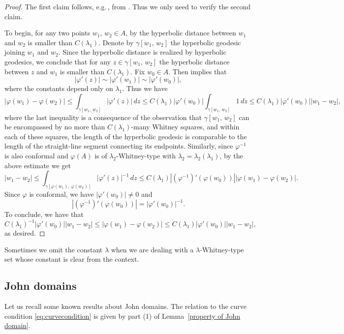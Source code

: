\documentclass[reqno,11pt]{amsart}
\numberwithin{equation}{section}
\theoremstyle{remark}
\begin{document}
\begin{proof}
The first claim follows, e.g.\,, from  \cite[Lemma 2.12]{KRZ2015}. Thus we only need to verify the second claim. 

To begin, for any two points $w_1,\,w_2\in A$, by \cite[Lemma 2.11]{KRZ2015} the hyperbolic distance between $w_1$ and $w_2$ is smaller than $C(\lambda_1)$. 
Denote by $\gamma[w_1,\,w_2]$ the  hyperbolic geodesic joining $w_1$ and $w_2$. Since the hyperbolic distance is realized by hyperbolic geodesics, we conclude that for any $z\in \gamma[w_1,\,w_2]$ the hyperbolic distance between $z$ and $w_1$ is smaller than $C(\lambda_1)$. Fix $w_0\in A$.  Then \cite[Theorem 2.10.8]{AIM2009}  implies that
$$|\varphi'(z)|\sim |\varphi'(w_1)|\sim |\varphi'(w_0)|,$$
where the constants depend only on $\lambda_1$. 
Thus we have
$$|\varphi(w_1)-\varphi(w_2)|\le \int_{\gamma[w_1,\,w_2]} |\varphi'(z)| \,dz \le C(\lambda_1) |\varphi'(w_0)| \int_{\gamma[w_1,\,w_2]}  1 \, dz \le C(\lambda_1) |\varphi'(w_0)| |w_1-w_2|, $$
where the last inequality is a consequence of the observation that 
 $\gamma[w_1,\,w_2]$ can be encompassed by no more than    $C(\lambda_1)$-many Whitney squares, and within each of these squares, the length of the hyperbolic geodesic is comparable to the length of the straight-line segment connecting its endpoints.
Similarly, since  $\varphi^{-1}$ is also conformal and $\varphi(A)$ is of $\lambda_2$-Whitney-type with $\lambda_2=\lambda_2(\lambda_1)$, 
by the above estimate we get
$$|w_1-w_2|\le \int_{\gamma[\varphi(w_1),\,\varphi(w_2)]} |\varphi'(z)|^{-1} \,dz \le  C(\lambda_1) |(\varphi^{-1})'(\varphi(w_0))| |\varphi(w_1)-\varphi(w_2)|. $$
Since $\varphi$ is conformal, we have $|\varphi'(w_0)|\neq 0$ and 
$$|(\varphi^{-1})'(\varphi(w_0))|=|\varphi'(w_0)|^{-1}.$$
To conclude, we have that
$$C(\lambda_1)^{-1} |\varphi'(w_0)| |w_1-w_2|\le   |\varphi(w_1)-\varphi(w_2)|\le C(\lambda_1) |\varphi'(w_0)| |w_1-w_2|,$$
as desired. 
\end{proof}

Sometimes we omit the constant $\lambda$ when we are dealing with a
$\lambda$-Whitney-type set whose constant is clear from the context. 




\subsection{John domains}

Let us recall some known results about John domains. The relation to the curve condition \eqref{eq:curvecondition} is given by part (1) of Lemma~\ref{property of John domain}. 
\end{document}
